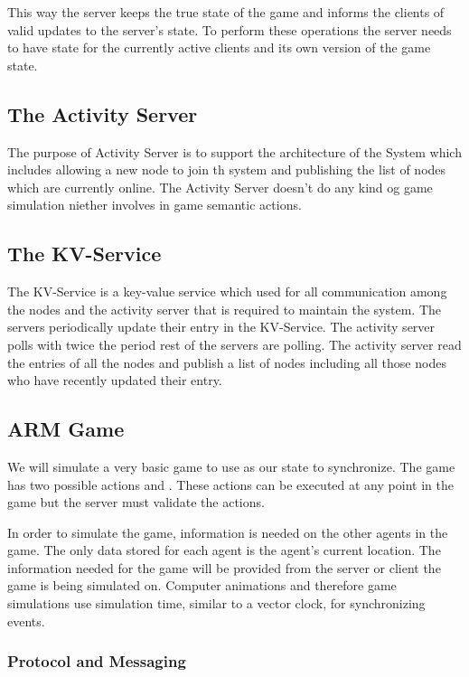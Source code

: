 	This way the server keeps the true state of the game and informs the clients of valid updates to the server's state. To perform these operations the server needs to have state for the currently active clients and its own version of the game state.

\subsection{The Activity Server}
	The purpose of Activity Server is to support the architecture of the System which includes allowing a new node to join th system and publishing the list of nodes which are currently online. The Activity Server doesn't do any kind og game simulation niether involves in game semantic actions.

\subsection{The KV-Service}
	The KV-Service is a key-value service which used for all communication among the nodes and the activity server that is required to maintain the system. The servers periodically update their entry in the KV-Service. The activity server polls with twice the period rest of the servers are polling. The activity server read the entries of all the nodes and publish a list of nodes including all those nodes who have recently updated their entry. 

\subsection{ARM Game}

	We will simulate a very basic game to use as our state to synchronize. 
	The game has two possible actions \move{\agent}{\position} and . These actions can be executed at any point in the game but the server must validate the actions. 
	
	In order to simulate the game, information is needed on the other agents in the game. The only data stored for each agent is the agent's current location. The information needed for the game will be provided from the server or client the game is being simulated on. Computer animations and therefore game simulations use simulation time, similar to a vector clock, for synchronizing events.
	
\subsubsection{Protocol and Messaging}

